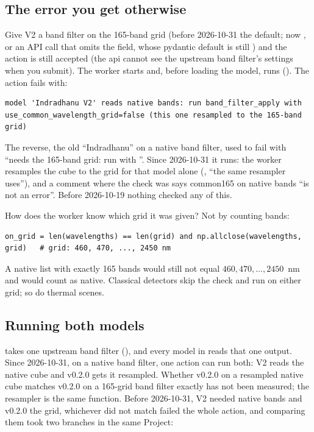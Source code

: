 \subsection{The error you get otherwise}

Give V2 a band filter on the 165-band grid (before 2026-10-31 the default; now ,
or an API call that omits the field, whose pydantic default is still ) and the action is still accepted
(the api cannot see the upstream band filter's settings when you submit). The worker starts and, before loading the
model, runs  (). The action fails with:
\begin{lstlisting}[language={}]
model 'Indradhanu V2' reads native bands: run band_filter_apply with
use_common_wavelength_grid=false (this one resampled to the 165-band grid)
\end{lstlisting}
The reverse, the old ``Indradhanu'' on a native band filter, used to fail with ``needs the 165-band grid: run
 with ''. Since 2026-10-31 it runs: the worker resamples
the cube to the grid for that model alone (, ``the same resampler  uses''), and
a comment where the check was says common165 on native bands ``is not an error''. Before 2026-10-19 nothing checked
any of this.

How does the worker know which grid it was given? Not by counting bands:
\begin{lstlisting}
on_grid = len(wavelengths) == len(grid) and np.allclose(wavelengths, grid)   # grid: 460, 470, ..., 2450 nm
\end{lstlisting}
A native list with exactly 165 bands would still not equal $460, 470, \dots, 2450$~nm and would count as
native. Classical detectors skip the check and run on either grid; so do thermal scenes.

\subsection{Running both models}

 takes one upstream band filter (), and every model in
 reads that one output. Since 2026-10-31, on a native band filter, one action can run both: V2
reads the native cube and v0.2.0 gets it resampled. Whether v0.2.0 on a resampled native cube matches v0.2.0 on a
165-grid band filter exactly has not been measured; the resampler is the same function. Before 2026-10-31, V2 needed
native bands and v0.2.0 the grid, whichever did not match failed the whole action, and comparing them took two
branches in the same Project:

